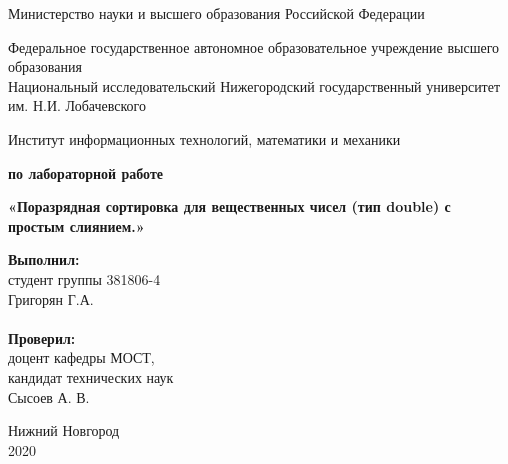\documentclass{report}
\begin{document}
\begin{titlepage}

\begin{center}
Министерство науки и высшего образования Российской Федерации
\end{center}

\begin{center}
Федеральное государственное автономное образовательное учреждение высшего образования \\
Национальный исследовательский Нижегородский государственный университет им. Н.И. Лобачевского
\end{center}

\begin{center}
Институт информационных технологий, математики и механики
\end{center}

\vspace{4em}

\begin{center}
\textbf{ по лабораторной работе} \\
\end{center}
\begin{center}
\textbf{\Large«Поразрядная сортировка для вещественных чисел 
(тип double) с простым слиянием.»} \\
\end{center}

\vspace{4em}

\newbox{\lbox}
\newlength{\maxl}
\setlength{\maxl}{\wd\lbox}
\hfill\parbox{7cm}{
\hspace*{5cm}\hspace*{-5cm}\textbf{Выполнил:} \\ студент группы 381806-4 \\ Григорян Г.А.\\
\\
\hspace*{5cm}\hspace*{-5cm}\textbf{Проверил:}\\ доцент кафедры МОСТ, \\ кандидат технических наук \\ Сысоев А. В. \\
}
\vspace{\fill}

\begin{center} Нижний Новгород \\ 2020 \end{center}

\end{titlepage}
\end{document}
